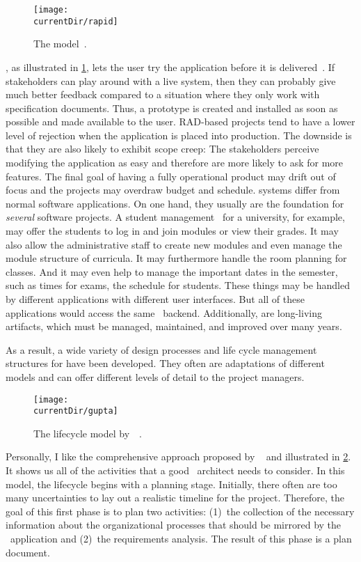 \begin{figure}%
\centering%
\texttt{[image: \\currentDir/rapid]}%
\caption{The  model~\cite{S2007OOSE,GMTM2011DDLC,I2018SAH,N2024SEFDS}.}%
\label{fig:model:rad}%
\end{figure}%
%
, as illustrated in \cref{fig:model:rad}, lets the user try the application before it is delivered~\cite{S2007OOSE,GMTM2011DDLC,M1996RTWSS}.
If stakeholders can play around with a live system, then they can probably give much better feedback compared to a situation where they only work with specification documents.
Thus, a prototype is created and installed as soon as possible and made available to the user.
RAD-based projects tend to have a lower level of rejection when the application is placed into production.
The downside is that they are also likely to exhibit scope creep:
The stakeholders perceive modifying the application as easy and therefore are more likely to ask for more features.
The final goal of having a fully operational product may drift out of focus and the projects may overdraw budget and schedule.%
\FloatBarrier%
\endhsection%
%
%
\FloatBarrier%
%
 systems differ from normal software applications.
On one hand, they usually are the foundation for \emph{several} software projects.
A student management \db\ for a university, for example, may offer the students to log in and join modules or view their grades.
It may also allow the administrative staff to create new modules and even manage the module structure of curricula.
It may furthermore handle the room planning for classes.
And it may even help to manage the important dates in the semester, such as times for exams, the schedule for students.
These things may be handled by different applications with different user interfaces.
But all of these applications would access the same \db\ backend.
Additionally,  are long-living artifacts, which must be managed, maintained, and improved over many years.

As a result, a wide variety of design processes and life cycle management structures for  have been developed.
They often are adaptations of different  models and can offer different levels of detail to the project managers.

\begin{figure}%
\centering%
\texttt{[image: \\currentDir/gupta]}%
\caption{The lifecycle model by~\citeauthor{GMTM2011DDLC}~\cite{GMTM2011DDLC}.}%
\label{fig:model:gupta}%
\end{figure}%
%
Personally, I like the comprehensive approach proposed by \citeauthor{GMTM2011DDLC}~\cite{GMTM2011DDLC} and illustrated in \cref{fig:model:gupta}.
It shows us all of the activities that a good \db~architect needs to consider.
In this model, the lifecycle begins with a planning stage.
Initially, there often are too many uncertainties to lay out a realistic timeline for the project.
Therefore, the goal of this first phase is to plan two activities:
(1)~the collection of the necessary information about the organizational processes that should be mirrored by the \db\ application and (2)~the requirements analysis.
The result of this phase is a plan document.

